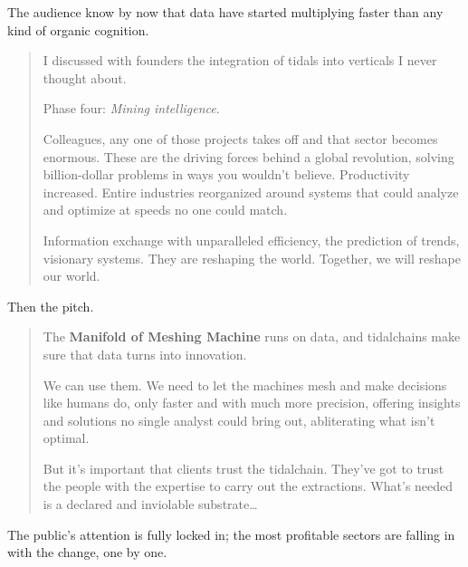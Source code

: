 The audience know by now that data have started multiplying faster than any kind of organic cognition.

\begin{quote}

I discussed with founders the integration of tidals into verticals I never thought about. 

Phase four: \textit{Mining intelligence}.

Colleagues, any one of those projects takes off and that sector becomes enormous. These are the driving forces behind a global revolution, solving billion-dollar problems in ways you wouldn't believe. Productivity increased. Entire industries reorganized around systems that could analyze and optimize at speeds no one could match.

Information exchange with unparalleled efficiency, the prediction of trends, visionary systems. They are reshaping the world. Together, we will reshape our world.


\end{quote}

Then the pitch.

\begin{quote}

The \color{nullmesh-accent}\sffamily\small\textbf{Manifold of Meshing Machine} runs on data, and tidalchains make sure that data turns into innovation.

We can use them. We need to let the machines mesh and make decisions like humans do, only faster and with much more precision, offering insights and solutions no single analyst could bring out, abliterating what isn’t optimal.

But it’s important that clients trust the tidalchain. They’ve got to trust the people with the expertise to carry out the extractions. What’s needed is a declared and inviolable substrate…
\end{quote}

The public’s attention is fully locked in; the most profitable sectors are falling in with the change, one by one.

